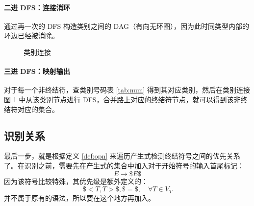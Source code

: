 \documentclass[UTF8]{ctexart}
\begin{document}
\paragraph{二进 DFS：连接消环} 通过再一次的 DFS 构造类别之间的 DAG（有向无环图），因为此时同类型内部的环边已经被消除。

\begin{figure}[H]
    \centering
    \caption{类别连接}\label{fig:conn}
\end{figure}

\paragraph{三进 DFS：映射输出} 对于每一个非终结符，查类别号码表 \ref{tab:num} 得到其对应类别，然后在类别连接图 \ref{fig:conn} 中从该类别节点进行 DFS，合并路上对应的终结符节点，就可以得到该非终结符对应的集合。

\begin{table}[h]
    \centering
    \caption{集合}
\end{table}

\subsection{识别关系}

最后一步，就是根据定义 \ref{def:opn} 来遍历产生式检测终结符号之间的优先关系了。在识别之前，需要先在产生式的集合中加入对于开始符号的输入首尾标记：
\begin{equation*}
    E \rightarrow \$ E \$
\end{equation*}
因为该符号比较特殊，其优先级是额外定义的\cite{opgwiki}：
\begin{equation*}
    \$ < T, T > \$, \$=\$,\quad \forall T\in V_T
\end{equation*}
并不属于原有的语法，所以要在这个地方再加入。
\end{document}
